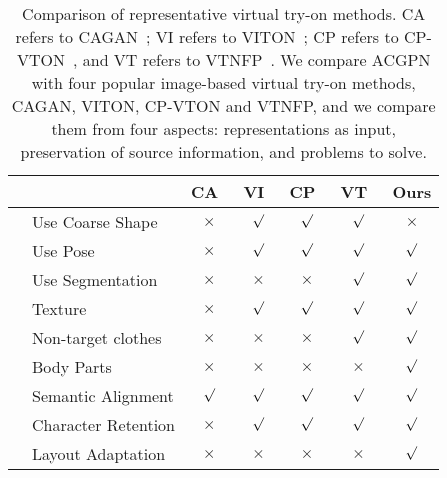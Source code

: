 \documentclass[10pt,twocolumn,letterpaper]{article}
\begin{document}
\begin{table}
\setlength{\baselineskip}{2em} \renewcommand\tabcolsep{1pt} \small
\begin{center}


\begin{tabular}{llccccc}
\hline
&&CA~\cite{DBLP:conf/iccvw/JetchevB17}&VI~\cite{DBLP:conf/cvpr/HanWWYD18}&CP~\cite{DBLP:conf/eccv/WangZLCLY18}&VT~\cite{Yu_2019_ICCV}&Ours\\
\hline\hline
\parbox[t]{2mm}{}&Use Coarse Shape& $\times$  &$\surd$&$\surd$&$\surd$&$\times$\\
&Use Pose& $\times$ &$\surd$&$\surd$&$\surd$&$\surd$\\
&Use Segmentation& $\times$ &$\times$&$\times$&$\surd$&$\surd$\\
\hline

\parbox[t]{2mm}{}&Texture& $\times$ &$\surd$&$\surd$&$\surd$&$\surd$\\
&Non-target clothes& $\times$ &$\times$&$\times$&$\surd$&$\surd$\\
&Body Parts& $\times$ &$\times$&$\times$&$\times$&$\surd$\\
\hline

\parbox[t]{2mm}{}&Semantic Alignment& $\surd$ &$\surd$&$\surd$&$\surd$&$\surd$\\
&Character Retention& $\times$ &$\surd$&$\surd$&$\surd$&$\surd$\\
&Layout Adaptation& $\times$ &$\times$&$\times$&$\times$&$\surd$\\

\hline
\end{tabular}
\vspace{10pt}

\caption{\footnotesize Comparison of representative virtual try-on methods. CA refers to CAGAN~\cite{DBLP:conf/iccvw/JetchevB17}; VI refers to VITON~\cite{DBLP:conf/cvpr/HanWWYD18}; CP refers to CP-VTON~\cite{DBLP:conf/eccv/WangZLCLY18}, and VT refers to VTNFP~\cite{Yu_2019_ICCV}. We compare ACGPN with four popular image-based virtual try-on methods, \ie CAGAN, VITON, CP-VTON and VTNFP, and we compare them from four aspects: representations as input, preservation of source information, and problems to solve.}
\label{tab:Overview}

\vspace{-20pt}

\end{center}
\end{table}
\end{document}
